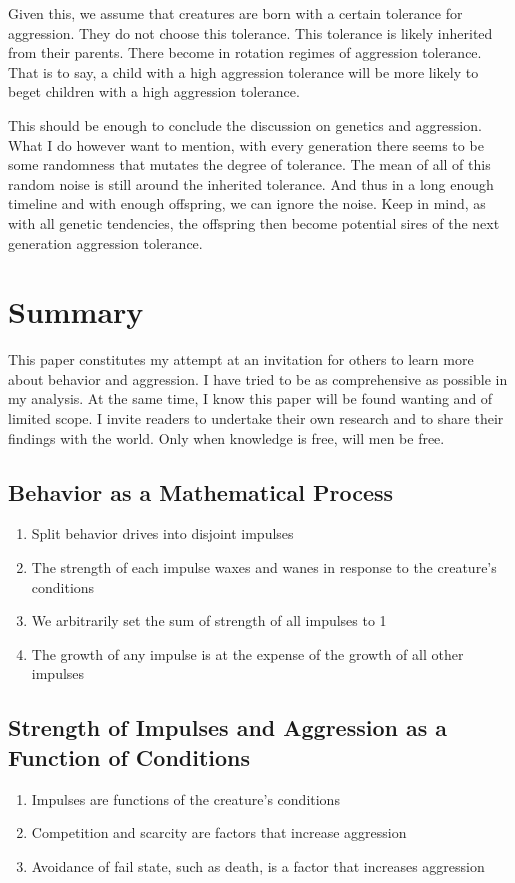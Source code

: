 \documentclass[12pt]{article}
\begin{document}
Given this, we assume that creatures are born with a certain tolerance for aggression.
They do not choose this tolerance.
This tolerance is likely inherited from their parents.
There become in rotation regimes of aggression tolerance.
That is to say, a child with a high aggression tolerance will be more likely to beget children with a high aggression tolerance.

This should be enough to conclude the discussion on genetics and aggression.
What I do however want to mention, with every generation there seems to be some randomness that mutates the degree of tolerance.
The mean of all of this random noise is still around the inherited tolerance.
And thus in a long enough timeline and with enough offspring, we can ignore the noise.
Keep in mind, as with all genetic tendencies, the offspring then become potential sires of the next generation aggression tolerance.

\section{Summary}
This paper constitutes my attempt at an invitation for others to learn more about behavior and aggression.
I have tried to be as comprehensive as possible in my analysis.
At the same time, I know this paper will be found wanting and of limited scope.
I invite readers to undertake their own research and to share their findings with the world.
Only when knowledge is free, will men be free.

\subsection{Behavior as a Mathematical Process}
\begin{enumerate}
    \item Split behavior drives into disjoint impulses
    \item The strength of each impulse waxes and wanes in response to the creature's conditions
    \item We arbitrarily set the sum of strength of all impulses to 1
    \item The growth of any impulse is at the expense of the growth of all other impulses
\end{enumerate}
\subsection{Strength of Impulses and Aggression as a Function of Conditions}
\begin{enumerate}
    \item Impulses are functions of the creature's conditions
    \item Competition and scarcity are factors that increase aggression
    \item Avoidance of fail state, such as death, is a factor that increases aggression
\end{enumerate}
\end{document}
